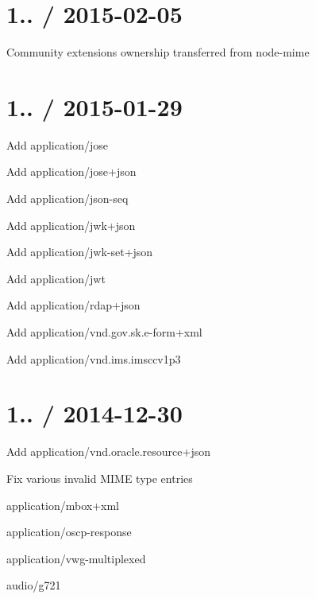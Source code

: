 \section*{1.. / 2015-\/02-\/05 }


\begin{DoxyItemize}
\item Community extensions ownership transferred from {\ttfamily node-\/mime}
\end{DoxyItemize}

\section*{1.. / 2015-\/01-\/29 }


\begin{DoxyItemize}
\item Add {\ttfamily application/jose}
\item Add {\ttfamily application/jose+json}
\item Add {\ttfamily application/json-\/seq}
\item Add {\ttfamily application/jwk+json}
\item Add {\ttfamily application/jwk-\/set+json}
\item Add {\ttfamily application/jwt}
\item Add {\ttfamily application/rdap+json}
\item Add {\ttfamily application/vnd.\+gov.\+sk.\+e-\/form+xml}
\item Add {\ttfamily application/vnd.\+ims.\+imsccv1p3}
\end{DoxyItemize}

\section*{1.. / 2014-\/12-\/30 }


\begin{DoxyItemize}
\item Add {\ttfamily application/vnd.\+oracle.\+resource+json}
\item Fix various invalid M\+I\+ME type entries
\begin{DoxyItemize}
\item {\ttfamily application/mbox+xml}
\item {\ttfamily application/oscp-\/response}
\item {\ttfamily application/vwg-\/multiplexed}
\item {\ttfamily audio/g721}
\end{DoxyItemize}
\end{DoxyItemize}

